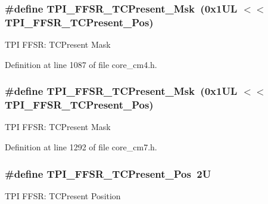 \subsubsection[{\texorpdfstring{T\+P\+I\+\_\+\+F\+F\+S\+R\+\_\+\+T\+C\+Present\+\_\+\+Msk}{TPI_FFSR_TCPresent_Msk}}]{\setlength{\rightskip}{0pt plus 5cm}\#define T\+P\+I\+\_\+\+F\+F\+S\+R\+\_\+\+T\+C\+Present\+\_\+\+Msk~(0x1\+U\+L $<$$<$ T\+P\+I\+\_\+\+F\+F\+S\+R\+\_\+\+T\+C\+Present\+\_\+\+Pos)}\hypertarget{group___c_m_s_i_s___t_p_i_ga0d6bfd263ff2fdec72d6ec9415fb1135}{}\label{group___c_m_s_i_s___t_p_i_ga0d6bfd263ff2fdec72d6ec9415fb1135}
T\+PI F\+F\+SR\+: T\+C\+Present Mask 

Definition at line 1087 of file core\+\_\+cm4.\+h.

\subsubsection[{\texorpdfstring{T\+P\+I\+\_\+\+F\+F\+S\+R\+\_\+\+T\+C\+Present\+\_\+\+Msk}{TPI_FFSR_TCPresent_Msk}}]{\setlength{\rightskip}{0pt plus 5cm}\#define T\+P\+I\+\_\+\+F\+F\+S\+R\+\_\+\+T\+C\+Present\+\_\+\+Msk~(0x1\+U\+L $<$$<$ T\+P\+I\+\_\+\+F\+F\+S\+R\+\_\+\+T\+C\+Present\+\_\+\+Pos)}\hypertarget{group___c_m_s_i_s___t_p_i_ga0d6bfd263ff2fdec72d6ec9415fb1135}{}\label{group___c_m_s_i_s___t_p_i_ga0d6bfd263ff2fdec72d6ec9415fb1135}
T\+PI F\+F\+SR\+: T\+C\+Present Mask 

Definition at line 1292 of file core\+\_\+cm7.\+h.

\subsubsection[{\texorpdfstring{T\+P\+I\+\_\+\+F\+F\+S\+R\+\_\+\+T\+C\+Present\+\_\+\+Pos}{TPI_FFSR_TCPresent_Pos}}]{\setlength{\rightskip}{0pt plus 5cm}\#define T\+P\+I\+\_\+\+F\+F\+S\+R\+\_\+\+T\+C\+Present\+\_\+\+Pos~2U}\hypertarget{group___c_m_s_i_s___t_p_i_gad30fde0c058da2ffb2b0a213be7a1b5c}{}\label{group___c_m_s_i_s___t_p_i_gad30fde0c058da2ffb2b0a213be7a1b5c}
T\+PI F\+F\+SR\+: T\+C\+Present Position 

